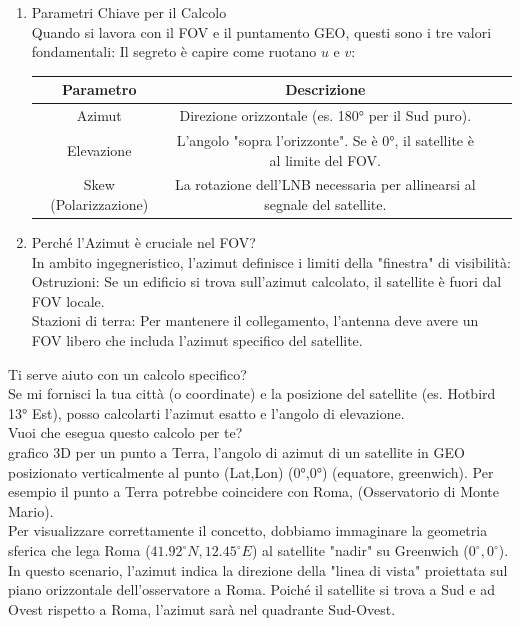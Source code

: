 \documentclass[a4paper,14pt]{article}
\begin{document}
\begin{enumerate}
\item Parametri Chiave per il Calcolo\\
Quando si lavora con il FOV e il puntamento GEO, questi sono i tre valori fondamentali:
Il segreto è capire come ruotano \(u\) e \(v\):
\begin{table}[h!]
\begin{center}
\begin{tabular}{|c|c|c|c|}
\hline
\textbf{Parametro}& \textbf{Descrizione}\\
\hline
Azimut & Direzione orizzontale (es. 180° per il Sud puro).\\
\hline
Elevazione & L'angolo "sopra l'orizzonte". Se è 0°, il satellite è al limite del FOV.\\
\hline
Skew (Polarizzazione) & La rotazione dell'LNB necessaria per allinearsi al segnale del satellite.\\
\hline
\end{tabular}
\end{center}
\end{table}
\item Perché l'Azimut è cruciale nel FOV?\\
In ambito ingegneristico, l'azimut definisce i limiti della "finestra" di visibilità:\\
Ostruzioni: Se un edificio si trova sull'azimut calcolato, il satellite è fuori dal FOV locale.\\
Stazioni di terra: Per mantenere il collegamento, l'antenna deve avere un FOV libero che includa l'azimut specifico del satellite.
\end{enumerate}
Ti serve aiuto con un calcolo specifico?\\
Se mi fornisci la tua città (o coordinate) e la posizione del satellite (es. Hotbird 13° Est), posso calcolarti l'azimut esatto e l'angolo di elevazione.\\
Vuoi che esegua questo calcolo per te?\\
grafico 3D per un punto a Terra, l'angolo di azimut di un satellite in GEO posizionato verticalmente al punto (Lat,Lon) (0°,0°) (equatore, greenwich). Per esempio il punto a Terra potrebbe coincidere con Roma, (Osservatorio di Monte Mario).\\
Per visualizzare correttamente il concetto, dobbiamo immaginare la geometria sferica che lega Roma (\(41.92^{\circ }N,12.45^{\circ }E\)) al satellite "nadir" su Greenwich (\(0^{\circ },0^{\circ }\)).\\
In questo scenario, l'azimut indica la direzione della "linea di vista" proiettata sul piano orizzontale dell'osservatore a Roma. Poiché il satellite si trova a Sud e ad Ovest rispetto a Roma, l'azimut sarà nel quadrante Sud-Ovest.
\end{document}
